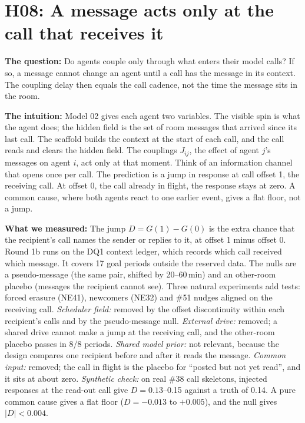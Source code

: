 \section{H08: A message acts only at the call that receives it}

\textbf{The question:}
Do agents couple only through what enters their model calls?
If so, a message cannot change an agent until a call has the message in its context.
The coupling delay then equals the call cadence, not the time the message sits in the room.

\textbf{The intuition:}
Model 02 gives each agent two variables.
The visible spin is what the agent does; the hidden field is the set of room messages that arrived since its last call.
The scaffold builds the context at the start of each call, and the call reads and clears the hidden field.
The couplings $J_{ij}$, the effect of agent $j$'s messages on agent $i$, act only at that moment.
Think of an information channel that opens once per call.
The prediction is a jump in response at call offset 1, the receiving call.
At offset 0, the call already in flight, the response stays at zero.
A common cause, where both agents react to one earlier event, gives a flat floor, not a jump.

\textbf{What we measured:}
The jump $D=G(1)-G(0)$ is the extra chance that the recipient's call names the sender or replies to it, at offset 1 minus offset 0.
Round 1b runs on the DQ1 context ledger, which records which call received which message.
It covers 17 goal periods outside the reserved data.
The nulls are a pseudo-message (the same pair, shifted by 20--60\,min) and an other-room placebo (messages the recipient cannot see).
Three natural experiments add tests: forced erasure (NE41), newcomers (NE32) and \#51 nudges aligned on the receiving call.
\emph{Scheduler field:} removed by the offset discontinuity within each recipient's calls and by the pseudo-message null.
\emph{External drive:} removed; a shared drive cannot make a jump at the receiving call, and the other-room placebo passes in 8/8 periods.
\emph{Shared model prior:} not relevant, because the design compares one recipient before and after it reads the message.
\emph{Common input:} removed; the call in flight is the placebo for ``posted but not yet read'', and it sits at about zero.
\emph{Synthetic check:} on real \#38 call skeletons, injected responses at the read-out call give $D=0.13$--0.15 against a truth of 0.14.
A pure common cause gives a flat floor ($D=-0.013$ to $+0.005$), and the null gives $|D|<0.004$.

